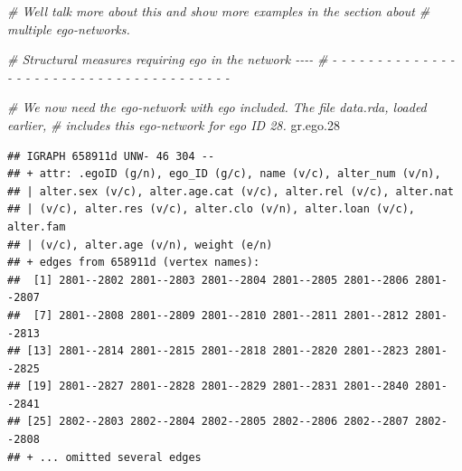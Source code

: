 \documentclass[
]{book}
\newenvironment{Shaded}{\begin{snugshade}}{\end{snugshade}}
\newcommand{\AttributeTok}[1]{\textcolor[rgb]{0.77,0.63,0.00}{#1}}
\newcommand{\CommentTok}[1]{\textcolor[rgb]{0.56,0.35,0.01}{\textit{#1}}}
\newcommand{\ConstantTok}[1]{\textcolor[rgb]{0.00,0.00,0.00}{#1}}
\newcommand{\FloatTok}[1]{\textcolor[rgb]{0.00,0.00,0.81}{#1}}
\newcommand{\FunctionTok}[1]{\textcolor[rgb]{0.00,0.00,0.00}{#1}}
\newcommand{\NormalTok}[1]{#1}
\newcommand{\OtherTok}[1]{\textcolor[rgb]{0.56,0.35,0.01}{#1}}
\newcommand{\StringTok}[1]{\textcolor[rgb]{0.31,0.60,0.02}{#1}}
\begin{document}
\begin{Shaded}
\begin{Highlighting}[]
\CommentTok{\# We\textquotesingle{}ll talk more about this and show more examples in the section about }
\CommentTok{\# multiple ego{-}networks.}

\CommentTok{\# Structural measures requiring ego in the network                          {-}{-}{-}{-}}
\CommentTok{\# {-} {-} {-} {-} {-} {-} {-} {-} {-} {-} {-} {-} {-} {-} {-} {-} {-} {-} {-} {-} {-} {-} {-} {-} {-} {-} {-} {-} {-} {-} {-} {-} {-} {-} {-} {-} {-} {-} {-} }

\CommentTok{\# We now need the ego{-}network with ego included. The file data.rda, loaded earlier,}
\CommentTok{\# includes this ego{-}network for ego ID 28. }
\NormalTok{gr.ego}\FloatTok{.28}
\end{Highlighting}
\end{Shaded}

\begin{verbatim}
## IGRAPH 658911d UNW- 46 304 -- 
## + attr: .egoID (g/n), ego_ID (g/c), name (v/c), alter_num (v/n),
## | alter.sex (v/c), alter.age.cat (v/c), alter.rel (v/c), alter.nat
## | (v/c), alter.res (v/c), alter.clo (v/n), alter.loan (v/c), alter.fam
## | (v/c), alter.age (v/n), weight (e/n)
## + edges from 658911d (vertex names):
##  [1] 2801--2802 2801--2803 2801--2804 2801--2805 2801--2806 2801--2807
##  [7] 2801--2808 2801--2809 2801--2810 2801--2811 2801--2812 2801--2813
## [13] 2801--2814 2801--2815 2801--2818 2801--2820 2801--2823 2801--2825
## [19] 2801--2827 2801--2828 2801--2829 2801--2831 2801--2840 2801--2841
## [25] 2802--2803 2802--2804 2802--2805 2802--2806 2802--2807 2802--2808
## + ... omitted several edges
\end{verbatim}

\begin{Shaded}
\end{Shaded}
\end{document}
